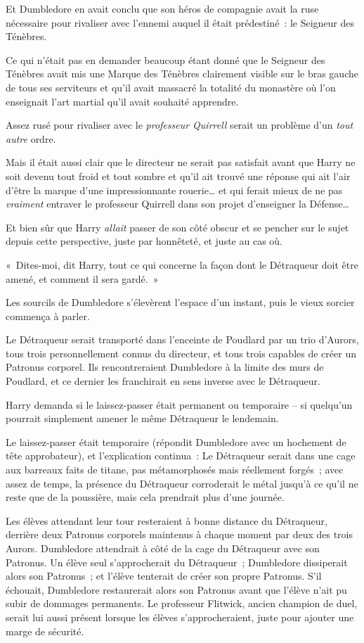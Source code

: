 Et Dumbledore en avait conclu que son héros de compagnie avait la ruse nécessaire pour rivaliser avec l'ennemi auquel il était prédestiné~: le Seigneur des Ténèbres.

Ce qui n'était pas en demander beaucoup étant donné que le Seigneur des Ténèbres avait mis une Marque des Ténèbres clairement visible sur le bras gauche de tous ses serviteurs et qu'il avait massacré la totalité du monastère où l'on enseignait l'art martial qu'il avait souhaité apprendre.

Assez rusé pour rivaliser avec le \emph{professeur Quirrell} serait un problème d'un \emph{tout} \emph{autre} ordre.

Mais il était aussi clair que le directeur ne serait pas satisfait avant que Harry ne soit devenu tout froid et tout sombre et qu'il ait trouvé une réponse qui ait l'air d'être la marque d'une impressionnante rouerie… et qui ferait mieux de ne pas \emph{vraiment} entraver le professeur Quirrell dans son projet d'enseigner la Défense…

Et bien sûr que Harry \emph{allait} passer de son côté obscur et se pencher sur le sujet depuis cette perspective, juste par honnêteté, et juste au cas où.

«~Dites-moi, dit Harry, tout ce qui concerne la façon dont le Détraqueur doit être amené, et comment il sera gardé.~»

Les sourcils de Dumbledore s'élevèrent l'espace d'un instant, puis le vieux sorcier commença à parler.

Le Détraqueur serait transporté dans l'enceinte de Poudlard par un trio d'Aurors, tous trois personnellement connus du directeur, et tous trois capables de créer un Patronus corporel.
Ils rencontreraient Dumbledore à la limite des murs de Poudlard, et ce dernier les franchirait en sens inverse avec le Détraqueur.

Harry demanda si le laissez-passer était permanent ou temporaire -- si quelqu'un pourrait simplement amener le même Détraqueur le lendemain.

Le laissez-passer était temporaire (répondit Dumbledore avec un hochement de tête approbateur), et l'explication continua~: Le Détraqueur serait dans une cage aux barreaux faits de titane, pas métamorphosés mais réellement forgés~; avec assez de temps, la présence du Détraqueur corroderait le métal jusqu'à ce qu'il ne reste que de la poussière, mais cela prendrait plus d'une journée.

Les élèves attendant leur tour resteraient à bonne distance du Détraqueur, derrière deux Patronus corporels maintenus à chaque moment par deux des trois Aurors.
Dumbledore attendrait à côté de la cage du Détraqueur avec son Patronus.
Un élève seul s'approcherait du Détraqueur~; Dumbledore dissiperait alors son Patronus~; et l'élève tenterait de créer son propre Patronus.
S'il échouait, Dumbledore restaurerait alors son Patronus avant que l'élève n'ait pu subir de dommages permanents.
Le professeur Flitwick, ancien champion de duel, serait lui aussi présent lorsque les élèves s'approcheraient, juste pour ajouter une marge de sécurité.

